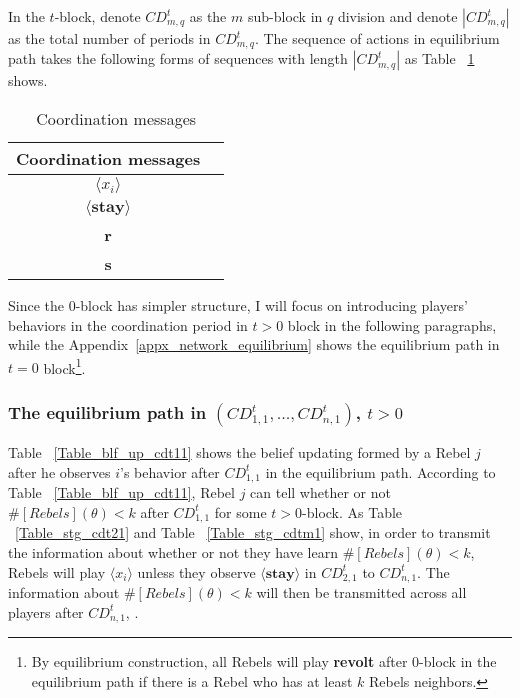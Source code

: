 \documentclass[12pt,letter]{article}
\theoremstyle{definition}
\theoremstyle{remark}
\theoremstyle{claim}
\begin{document}
In the $t$-block, denote $CD^t_{m,q}$ as the $m$ sub-block in $q$ division and denote $| CD^t_{m,q} |$ as the total number of periods in $CD^t_{m,q}$.  The sequence of actions in equilibrium path takes the following forms of sequences with length $| CD^t_{m,q} |$ as Table ~\ref{Table_msg_coordination} shows.
\begin{table}[ht]
\caption{Coordination messages}
\label{Table_msg_coordination}
\begin{center}

\begin{tabular}{cc }
Coordination messages		&   \\
\hline
$\langle x_i \rangle$ 	& 	 \\
$\langle \textbf{stay} \rangle$	&   \\
\textbf{r}									& 	\\
\textbf{s}									& 	\\
\end{tabular}
\end{center}
\end{table}

Since the $0$-block has simpler structure, I will focus on introducing players' behaviors in the coordination period in $t>0$ block in the following paragraphs, while the Appendix~\ref{appx_network_equilibrium} shows the equilibrium path in $t=0$ block\footnote{By equilibrium construction, all Rebels will play \textbf{revolt} after $0$-block in the equilibrium path if there is a Rebel who has at least $k$ Rebels neighbors. }. 

\subsubsection*{The equilibrium path in $(CD^t_{1,1},...,CD^t_{n,1})$, $t>0$}
Table ~\ref{Table_blf_up_cdt11} shows the belief updating formed by a Rebel $j$ after he observes $i$'s behavior after $CD^t_{1,1}$ in the equilibrium path. According to Table ~\ref{Table_blf_up_cdt11}, Rebel $j$ can tell whether or not $\#[Rebels](\theta)< k$ after $CD^t_{1,1}$ for some $t>0$-block. As Table ~\ref{Table_stg_cdt21} and Table ~\ref{Table_stg_cdtm1} show, in order to transmit the information about whether or not they have learn $\#[Rebels](\theta)< k$, Rebels will play $\langle x_i \rangle$ unless they observe  $\langle \textbf{stay} \rangle$ in $CD^t_{2,1}$ to $CD^t_{n,1}$.   The information about $\#[Rebels](\theta)< k$ will then be transmitted across all players after $CD^t_{n,1}$, . 
\end{document}

